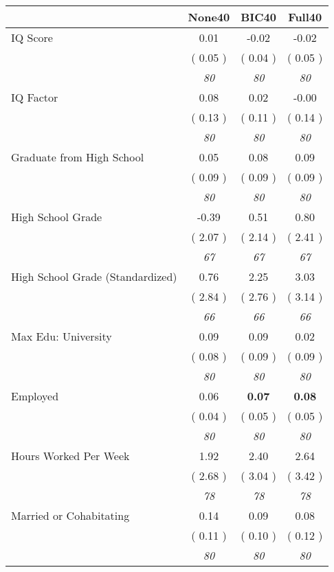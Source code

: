 \begin{tabular}{l c c c}
\toprule
 & None40 & BIC40 & Full40 \\
\midrule
IQ Score &      0.01 &     -0.02 &     -0.02 \\
& (     0.05 ) & (     0.04 ) & (     0.05 ) \\
& \textit{ 80 } & \textit{ 80 } & \textit{ 80 } \\
IQ Factor &      0.08 &      0.02 &     -0.00 \\
& (     0.13 ) & (     0.11 ) & (     0.14 ) \\
& \textit{ 80 } & \textit{ 80 } & \textit{ 80 } \\
Graduate from High School &      0.05 &      0.08 &      0.09 \\
& (     0.09 ) & (     0.09 ) & (     0.09 ) \\
& \textit{ 80 } & \textit{ 80 } & \textit{ 80 } \\
High School Grade &     -0.39 &      0.51 &      0.80 \\
& (     2.07 ) & (     2.14 ) & (     2.41 ) \\
& \textit{ 67 } & \textit{ 67 } & \textit{ 67 } \\
High School Grade (Standardized) &      0.76 &      2.25 &      3.03 \\
& (     2.84 ) & (     2.76 ) & (     3.14 ) \\
& \textit{ 66 } & \textit{ 66 } & \textit{ 66 } \\
Max Edu: University &      0.09 &      0.09 &      0.02 \\
& (     0.08 ) & (     0.09 ) & (     0.09 ) \\
& \textit{ 80 } & \textit{ 80 } & \textit{ 80 } \\
Employed &      0.06 & \textbf{      0.07 } & \textbf{      0.08 } \\
& (     0.04 ) & (     0.05 ) & (     0.05 ) \\
& \textit{ 80 } & \textit{ 80 } & \textit{ 80 } \\
Hours Worked Per Week &      1.92 &      2.40 &      2.64 \\
& (     2.68 ) & (     3.04 ) & (     3.42 ) \\
& \textit{ 78 } & \textit{ 78 } & \textit{ 78 } \\
Married or Cohabitating &      0.14 &      0.09 &      0.08 \\
& (     0.11 ) & (     0.10 ) & (     0.12 ) \\
& \textit{ 80 } & \textit{ 80 } & \textit{ 80 } \\

\end{tabular}
